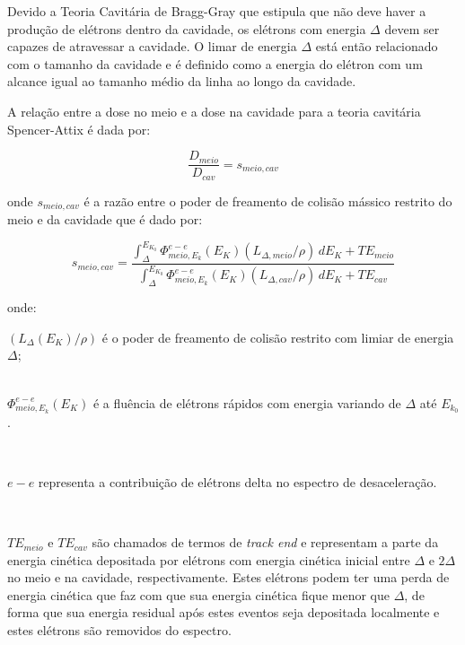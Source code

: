 \documentclass[11pt,a4paper]{article}
\newcounter{exemplo}
\begin{document}
			Devido a Teoria Cavitária de Bragg-Gray que estipula que não deve haver a produção de elétrons dentro da cavidade, os elétrons com energia $\Delta$ devem ser capazes de atravessar a cavidade. O limar de energia $\Delta$ está então relacionado com o tamanho da cavidade e é definido como a energia do elétron com um alcance igual ao tamanho médio da linha ao longo da cavidade. 

			A relação entre a dose no meio e a dose na cavidade para a teoria cavitária Spencer-Attix é dada por:

				\begin{equation}
					\frac{D_{meio}}{D_{cav}} = s_{meio,cav}
				\end{equation}

			\noindent onde $s_{meio,cav}$ é a razão entre o poder de freamento de colisão mássico restrito do meio e da cavidade que é dado por:

			
			\begin{equation}
				s_{meio,cav}
				= \frac{\int_{\Delta}^{E_{K_0}} \Phi_{meio, E_k}^{e-e}(E_K)(L_{\Delta , meio}/\rho)\,dE_K + TE_{meio}}
				{\int_{\Delta}^{E_{K_0}} \Phi_{meio, E_k}^{e-e}(E_K)(L_{\Delta , cav}/\rho)\,dE_K + TE_{cav}}
			\end{equation}

			\noindent onde:

			\begin{exemplo}
				
			
			\begin{flushleft}
				$(L_{\Delta}(E_K)/\rho)$ é o poder de freamento de colisão restrito com limiar de energia $\Delta$; \\

				\

				$\Phi_{meio, E_k}^{e-e}(E_K)$ é a fluência de elétrons rápidos com energia variando de $\Delta$ até $E_{k_0}$.

				\

				$e-e$ representa a contribuição de elétrons delta no espectro de desaceleração.

				\

				$TE_{meio}$ e $TE_{cav}$ são chamados de termos de \textit{track end} e representam a parte da energia cinética depositada por elétrons com energia cinética inicial entre $\Delta$ e $2\Delta$ no meio e na cavidade, respectivamente. Estes elétrons podem ter uma perda de energia cinética que faz com que sua energia cinética fique menor que $\Delta$, de forma que sua energia residual após estes eventos seja depositada localmente e estes elétrons são removidos do espectro. 

			\end{flushleft}
			\end{exemplo}
\end{document}
